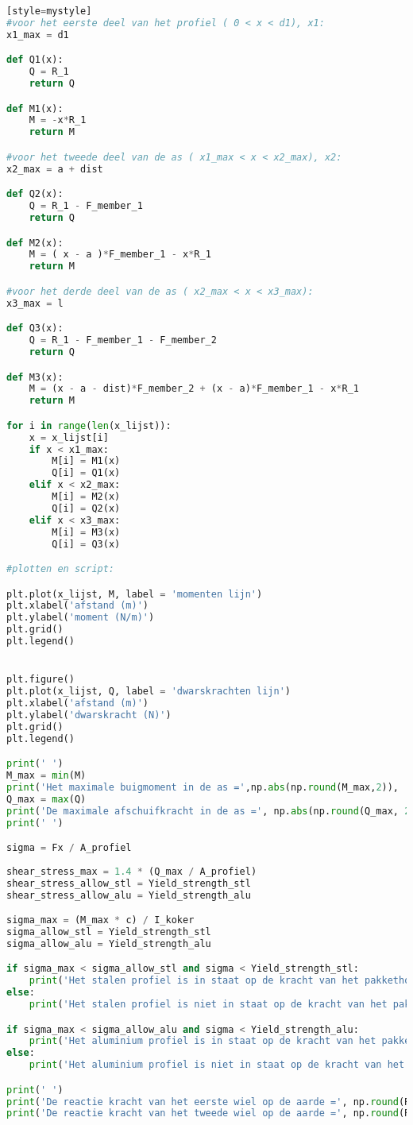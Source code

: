 \begin{lstlisting}[language=Python][style=mystyle]
#voor het eerste deel van het profiel ( 0 < x < d1), x1:
x1_max = d1

def Q1(x):
    Q = R_1
    return Q

def M1(x):
    M = -x*R_1
    return M

#voor het tweede deel van de as ( x1_max < x < x2_max), x2:
x2_max = a + dist

def Q2(x):
    Q = R_1 - F_member_1
    return Q

def M2(x):
    M = ( x - a )*F_member_1 - x*R_1
    return M

#voor het derde deel van de as ( x2_max < x < x3_max):
x3_max = l 

def Q3(x):
    Q = R_1 - F_member_1 - F_member_2
    return Q

def M3(x):
    M = (x - a - dist)*F_member_2 + (x - a)*F_member_1 - x*R_1
    return M

for i in range(len(x_lijst)):
    x = x_lijst[i]
    if x < x1_max:
        M[i] = M1(x)
        Q[i] = Q1(x)
    elif x < x2_max:
        M[i] = M2(x)
        Q[i] = Q2(x)
    elif x < x3_max:
        M[i] = M3(x)
        Q[i] = Q3(x)

#plotten en script:

plt.plot(x_lijst, M, label = 'momenten lijn')
plt.xlabel('afstand (m)')
plt.ylabel('moment (N/m)')
plt.grid()
plt.legend()


plt.figure()
plt.plot(x_lijst, Q, label = 'dwarskrachten lijn')
plt.xlabel('afstand (m)')
plt.ylabel('dwarskracht (N)')
plt.grid()
plt.legend()

print(' ')
M_max = min(M)    
print('Het maximale buigmoment in de as =',np.abs(np.round(M_max,2)), 'N/m')  
Q_max = max(Q)
print('De maximale afschuifkracht in de as =', np.abs(np.round(Q_max, 2)), 'N')
print(' ')

sigma = Fx / A_profiel
    
shear_stress_max = 1.4 * (Q_max / A_profiel)
shear_stress_allow_stl = Yield_strength_stl
shear_stress_allow_alu = Yield_strength_alu

sigma_max = (M_max * c) / I_koker
sigma_allow_stl = Yield_strength_stl
sigma_allow_alu = Yield_strength_alu

if sigma_max < sigma_allow_stl and sigma < Yield_strength_stl:
    print('Het stalen profiel is in staat op de kracht van het pakkethondje op te vangen')
else:
    print('Het stalen profiel is niet in staat op de kracht van het pakkethondje op te vangen')

if sigma_max < sigma_allow_alu and sigma < Yield_strength_alu:
    print('Het aluminium profiel is in staat op de kracht van het pakkethondje op te vangen')
else:
    print('Het aluminium profiel is niet in staat op de kracht van het pakkethondje op te vangen')

print(' ')
print('De reactie kracht van het eerste wiel op de aarde =', np.round(R_1,2), 'N')
print('De reactie kracht van het tweede wiel op de aarde =', np.round(R_2,2), 'N')


\end{lstlisting}





